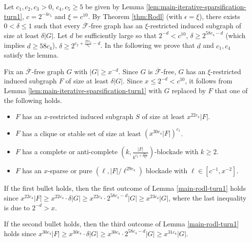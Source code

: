 \documentclass[a4paper,11pt]{article}
\let\oldendproof\endproof
\renewenvironment{proof}[1][\proofname]{%
	\oldproof[\normalfont\bfseries #1]%
}{\oldendproof}
\begin{document}
    \begin{proof}
        Let $c_1,c_2,c_3>0$, $c_4,c_5\geq 5$ be given by Lemma \ref{lem:main-iterative-sparsification-turn1}, $c=2^{-4c_5}$ and $\xi=c^{10}$. 
        By Theorem \ref{thm:Rodl} (with $\epsilon=\xi$), there exists $0<\delta\leq 1$ such that every $\overline{\mathcal{F}}$-free graph has an $\xi$-restricted induced subgraph of size at least $\delta|G|$. 
        Let $d$ be sufficiently large so that $2^{-d}<c^{10}$, $\delta\geq 2^{58c_4-d}$ (which implies $d\geq 58c_4$), $\delta\geq 2^{c_2+\frac{27c_4}{c_3}-d}$.
        In the following we prove that $d$ and $c_1,c_4$ satisfy the lemma.

        Fix an $\overline{\mathcal{F}}$-free graph $G$ with $|G|\geq x^{-d}$.
        Since $G$ is $\overline{\mathcal{F}}$-free, $G$ has an $\xi$-restricted induced subgraph $F$ of size at least $\delta|G|$. 
        Since $x\leq 2^{-d}< c^{10}$, it follows from Lemma \ref{lem:main-iterative-sparsification-turn1} with $G$ replaced by $F$ that one of the following holds.
        
        \begin{itemize}
            \item $F$ has an $x$-restricted induced subgraph $S$ of size at least $x^{22c_4}|F|$.
            
            \item $F$ has a clique or stable set of size at least $(x^{30c_4}|F|)^{c_1}$.
            
            \item $F$ has a complete or anti-complete $(k,\frac{|F|}{k^{c_2+\frac{27c_4}{c_3}}})$-blockade with $k\geq 2$.
            
            \item $F$ has an $x$-sparse or pure $(\ell,|F|/\ell^{29c_4})$ blockade with $\ell\in[c^{-1}, x^{-2}]$.

        \end{itemize}

        If the first bullet holds, then the first outcome of Lemma \ref{main-rodl-turn1} holds since $x^{22c_4}|F|\geq x^{22c_4}\cdot \delta|G|\geq x^{22c_4}\cdot 2^{58c_4-d}|G|\geq x^{23c_4}|G|$, where the last inequality is due to $2^{-d}>x$.

        If the second bullet holds, then the third outcome of Lemma \ref{main-rodl-turn1} holds since $x^{30c_4}|F|\geq x^{30c_4}\cdot \delta|G|\geq x^{30c_4}\cdot 2^{58c_4-d}|G|\geq x^{31c_4}|G|$. 
         


\end{proof}
\end{document}
